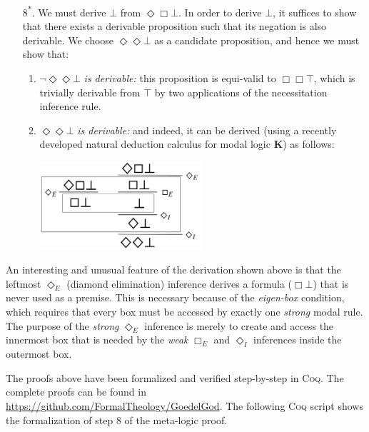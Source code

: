 \documentclass{llncs}
\newcommand{\logic}[1]{\textbf{#1}\xspace}
\newcommand{\K}{\logic{K}}
\newcommand{\Dia}{\Diamond} %
\newcommand{\nec}{\Box}
\newcommand{\pos}{\Dia}
\begin{document}
\begin{enumerate}
\item[8\textsuperscript{*}.] We must derive $\bot$ from $\pos \nec \bot$. In order to derive $\bot$, it suffices to show that there exists a derivable proposition such that its negation is also derivable. We choose $\pos \pos \bot$ as a candidate proposition, and hence we must show that:
\begin{enumerate}
\item $\neg \pos \pos \bot$ \emph{is derivable:} this proposition is equi-valid to $\nec \nec \top$, which is trivially derivable from $\top$ by two applications of the necessitation inference rule.

\item $\pos \pos \bot$ \emph{is derivable:} and indeed, it can be derived (using a recently developed natural deduction calculus for modal logic \K \cite{CSR}) as follows:
\begin{center}
\includegraphics[width=0.5\textwidth]{Derivation}
\end{center}

\end{enumerate}

\end{enumerate}

An interesting and unusual feature of the derivation shown above is that the leftmost $\pos_E$ (diamond elimination) inference derives a formula ($\nec \bot$) that is never used as a premise. This is necessary because of the \emph{eigen-box} condition, which requires that every box must be accessed by exactly one \emph{strong} modal rule. The purpose of the \emph{strong} $\pos_E$ inference is merely to create and access the innermost box that is needed by the \emph{weak} $\nec_E$ and $\pos_I$ inferences inside the outermost box.

The proofs above have been formalized and verified step-by-step in \textsc{Coq}. The complete proofs can be found in \url{https://github.com/FormalTheology/GoedelGod}. The following \textsc{Coq} script shows the formalization of step 8 of the meta-logic proof.
\end{document}
